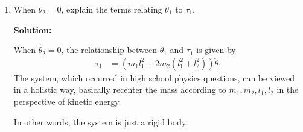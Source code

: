 \documentclass[conference,onecolumn]{IEEEtran}
\begin{document}
\begin{enumerate}
\begin{enumerate}
\begin{align*}
                        \end{align*}
                        And
                        \begin{align*}
                              \tau_2 & = \frac{d}{dt} \left( \frac{\partial L}{\partial \dot{\theta}_2} \right) - \frac{\partial L}{\partial \theta_2} \Rightarrow \\
                              \tau_2 & = \frac{d}{dt} \left( 2 m_2 l_2^2 \dot{\theta}_1 + 2 m_2 l_2^2 \dot{\theta}_2 \right) - 0 \Rightarrow                       \\
                              \tau_2 & = 2 m_2 l_2^2 \ddot{\theta}_1 + 2 m_2 l_2^2 \ddot{\theta}_2
                        \end{align*}
                  \item When $\ddot{\theta}_2 = 0$, explain the terms relating $\ddot{\theta}_1$ to $\tau_1$.

                        \textbf{Solution:}

                        When $\ddot{\theta}_2 = 0$, the relationship between $\ddot{\theta}_1$ and $\tau_1$ is given by
                        \begin{align*}
                              \tau_1 & = \left( m_1 l_1^2 + 2 m_2 (l_1^2 + l_2^2) \right) \ddot{\theta}_1
                        \end{align*}
                        The system, which occurred in high school physics questions, can be viewed in a holistic way, basically recenter the mass according to $m_1, m_2, l_1, l_2$ in the perspective of kinetic energy.

                        In other words, the system is just a rigid body.
            \end{enumerate}
\end{enumerate}
\end{document}
